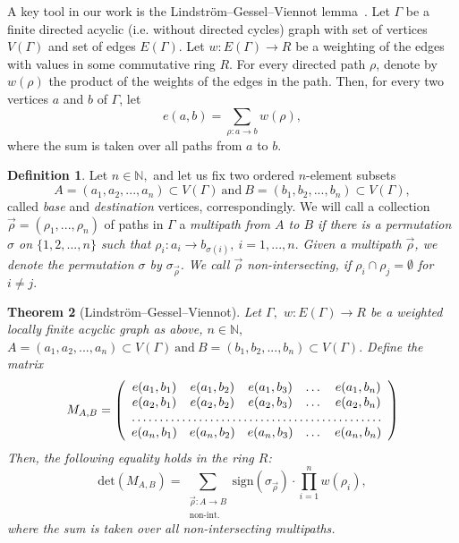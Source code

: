 \documentclass{article}
\theoremstyle{plain}
\newtheorem{thm}{Theorem}[section]
\theoremstyle{definition}
\newtheorem{defn}[thm]{Definition}
\begin{document}
A key tool in our work is the Lindström–Gessel–Viennot
lemma~\cite{Fulmek10}.  Let $\Gamma$ be a finite directed
acyclic (i.e. without directed cycles) graph with  set of vertices $V(\Gamma)$ and set of
edges $E(\Gamma)$. Let $w:E(\Gamma)\rightarrow R$
be a weighting of the edges with values in some commutative ring $R$.  For
every directed path $\rho$, denote by $w(\rho)$ the product of the
weights of the edges in the path. Then, for every two vertices $a$ and
$b$ of $\Gamma$, let $$e(a,b)=\sum\limits_{\rho:a\rightarrow b} w(\rho),$$ where
the sum is taken over all paths from $a$ to $b$.  




\begin{defn}
Let $n\in\mathbb{N},$ and let us fix two ordered
$n$-element subsets $$A=(a_1,a_2,..., a_n)\subset V(\Gamma)\
\text{and}\ B=(b_1,b_2,..., b_n)\subset V(\Gamma),$$ called {\em base} and
{\em destination} vertices, correspondingly.
  We will call a collection $\vec{\rho}=(\rho_1,...,\rho_n)$ of paths in
  $\Gamma$ a \em multipath \normalfont from $A$ to $B$ if there is a
  permutation $\sigma$ on $\{1,2,...,n\}$ such that
  $\rho_i:a_i\rightarrow b_{\sigma(i)},\ i=1,...,n.$ Given a multipath $\vec{\rho}$, we
  denote the permutation $\sigma$ by $\sigma_{\vec{\rho}}$. We call $\vec{\rho}$ \em
  non-intersecting, \normalfont if $\rho_i\cap \rho_j = \emptyset$ for
  $i\not= j.$
\end{defn}

\begin{thm}[Lindström–Gessel–Viennot]\label{L_G_V}
Let $\Gamma,$ $w:E(\Gamma)\rightarrow R$ be a weighted locally finite acyclic graph as above, $n\in\mathbb{N},$ $A=(a_1,a_2,..., a_n)\subset V(\Gamma)\
\text{and}\ B=(b_1,b_2,..., b_n)\subset V(\Gamma).$ Define  the
matrix
\[ M_{A,B}= \left( \begin{array}{cccccc}
e(a_1,b_1)      & e(a_1,b_2)  & e(a_1,b_3)& \dots  & e(a_1,b_n) \\
e(a_2,b_1)      & e(a_2,b_2)  & e(a_2,b_3)& \dots  & e(a_2,b_n) \\
\hdotsfor{5} \\
e(a_n,b_1)      & e(a_n,b_2)  & e(a_n,b_3)& \dots  & e(a_n,b_n) \\
\end{array} \right)\]
Then, the following equality holds in the ring $R$:
$$\mathrm{det}(M_{A,B}) = \sum\limits_{\substack{\vec{\rho}:A\rightarrow B\\ \text{non-int.}}} \mathrm{sign}(\sigma_{\vec{\rho}})\cdot\prod\limits_{i=1}^n w(\rho_i),$$
where the sum is taken over all non-intersecting multipaths.
\end{thm}
\end{document}
